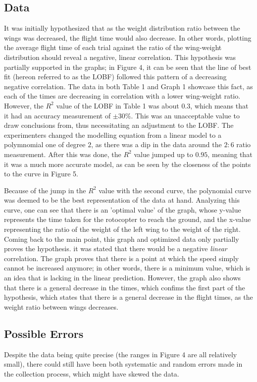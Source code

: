 \documentclass[]{article}
\begin{document}
\subsection{Data}
It was initially hypothesized that as the weight distribution ratio between the wings was decreased, the flight time would also decrease. In other words, plotting the average flight time of each trial against the ratio of the wing-weight distribution should reveal a negative, linear correlation. This hypothesis was partially supported in the graphs; in Figure 4, it can be seen that the line of best fit (hereon referred to as the LOBF) followed this pattern of a decreasing negative correlation. The data in both Table 1 and Graph 1 showcase this fact, as each of the times are decreasing in correlation with a lower wing-weight ratio. However, the $R^2$ value of the LOBF in Table 1 was about $0.3$, which means that it had an accuracy measurement of $\pm 30\%$. This was an unacceptable value to draw conclusions from, thus necessitating an adjustment to the LOBF. The experimenters changed the modelling equation from a linear model to a polymnomial one of degree $2$, as there was a dip in the data around the $2:6$ ratio measurement. After this was done, the $R^2$ value jumped up to $0.95$, meaning that it was a much more accurate model, as can be seen by the closeness of the points to the curve in Figure 5.

Because of the jump in the $R^2$ value with the second curve, the polynomial curve was deemed to be the best representation of the data at hand. Analyzing this curve, one can see that there is an 'optimal value' of the graph, whose y-value represents the time taken for the rotocopter to reach the ground, and the x-value representing the ratio of the weight of the left wing to the weight of the right. Coming back to the main point, this graph and optimized data only partially proves the hypothesis. it was stated that there would be a negative \textit{linear} correlation. The graph proves that there is a point at which the speed simply cannot be increased anymore; in other words, there is a minimum value, which is an idea that is lacking in the linear prediction. However, the graph also shows that there is a general decrease in the times, which confims the first part of the hypothesis, which states that there is a general decrease in the flight times, as the weight ratio between wings decreases.

\subsection{Possible Errors}
Despite the data being quite precise (the ranges in Figure 4 are all relatively small), there could still have been both systematic and random errors made in the collection process, which might have skewed the data.
\end{document}
